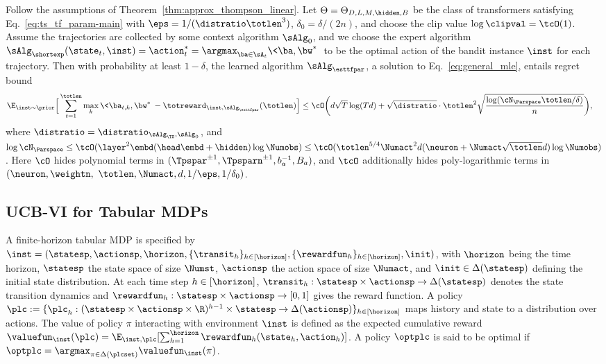 \documentclass[10pt]{article}
\begin{document}
\begin{theorem}
\label{thm:ts_linear_regret}
Follow the assumptions of Theorem~\ref{thm:approx_thompson_linear}. Let $\Theta = \Theta_{D, L, M, \hidden, B}$ be the class of transformers satisfying Eq.~\eqref{eq:ts_tf_param-main} with $\eps=1/(\distratio\totlen^3)$,   $\delta_0=\delta/(2n)$, and choose the clip value $\log \clipval = \tcO(1)$. Assume the trajectories are collected by some context algorithm $\sAlg_0$, and we choose the expert algorithm $\sAlg_\shortexp(\state_t,\inst)=\action^*_t=\argmax_{\ba\in\sA_t}\<\ba,\bw^*\>$ to be the optimal action of the bandit instance $\inst$ for each trajectory. Then with probability at least $1-\delta$, the learned algorithm $\sAlg_{\esttfpar}$, a solution to Eq.~\eqref{eq:general_mle}, entails regret bound
\begin{align*}
\E_{\inst\sim\prior}\Big[\sum_{t=1}^\totlen\max_{k}\<\ba_{t,k},\bw^*\>-\totreward_{\inst,\sAlg_\esttfpar}(\totlen)\Big]&\leq \cO \bigg( d\sqrt{T}\log(Td)+ \sqrt{\distratio} \cdot\totlen^2\sqrt{\frac{\log ( \cN_{\Parspace} \totlen/\delta ) }{n} } \bigg),
\end{align*}
where $\distratio = \distratio_{\sAlg_\TS,\sAlg_0}$, and $\log \cN_{\Parspace} \le \tcO(\layer^2\embd(\head\embd+\hidden)\log \Numobs )  \leq\tcO(\totlen^{5/4}\Numact^2 d(\neuron+\Numact\sqrt{\totlen}d)\log\Numobs)$. Here $\cO$ hides polynomial terms in $(\Tpspar^{\pm1}, \Tpsparn^{\pm1}, b_a^{-1}, B_a)$, and $\tcO$ additionally hides poly-logarithmic terms in   $(\neuron,\weightn,\\~ \totlen, \Numact, d, 1/\eps, 1/\delta_0)$.
\end{theorem}




\subsection{UCB-VI for Tabular MDPs}\label{sec:Tabular-MDP-statement}


A finite-horizon tabular MDP is specified by $\inst=(\statesp,\actionsp, \horizon, \{\transit_h\}_{h\in[\horizon]},\{\rewardfun_h\}_{h\in[\horizon]},\init)$, with $\horizon$ being the time horizon, $\statesp$ the state space of size $\Numst$, $\actionsp$ the action space of size $\Numact$, and $\init\in\Delta(\statesp)$ defining the initial state distribution. At each time step $h\in[\horizon]$, $\transit_h: \statesp\times\actionsp \to \Delta(\statesp)$ denotes the state transition dynamics and $\rewardfun_h:\statesp \times \actionsp \to [0,1]$ gives the reward function. A policy $\plc:=\{\plc_h:(\statesp \times\actionsp \times \R)^{h-1}\times\statesp \to\Delta(\actionsp)\}_{h \in [\horizon]}$ maps history and state to a distribution over actions. The value of policy $\pi$ interacting with environment $\inst$ is defined as the expected cumulative reward $\valuefun_\inst(\plc)=\E_{\inst,\plc}[\sum_{h=1}^\horizon \rewardfun_h (\state_h,\action_h)]$. A policy $\optplc$ is said to be optimal if $\optplc=\argmax_{\pi\in\Delta(\plcset)}\valuefun_\inst(\pi)$.
\end{document}

